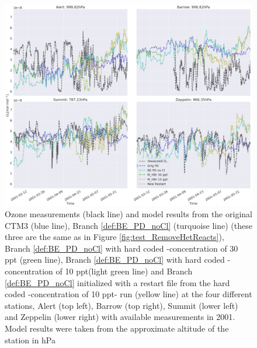 \begin{figure}[ht]
    \centering
    \includegraphics[width=\linewidth]{Chapter6_Results/images/ozone_stationComp_2001/ozone_noCl_step2.png}
    \caption{Ozone measurements (black line) and model results from the original CTM3 (blue line), Branch \ref{def:BE_PD_noCl} (turquoise line) (these three are the same as in Figure \ref{fig:test_RemoveHetReacts}), Branch \ref{def:BE_PD_noCl} with hard coded -concentration of 30 ppt (green line), Branch \ref{def:BE_PD_noCl} with hard coded -concentration of 10 ppt(light green line) and Branch \ref{def:BE_PD_noCl} initialized with a restart file from the hard coded -concentration of 10 ppt- run (yellow line) at the four different stations, Alert (top left), Barrow (top right), Summit (lower left) and Zeppelin (lower right) with available measurements in 2001. Model results were taken from the approximate altitude of the station in hPa}
    \label{fig:ozone_noCl_step2}
\end{figure}